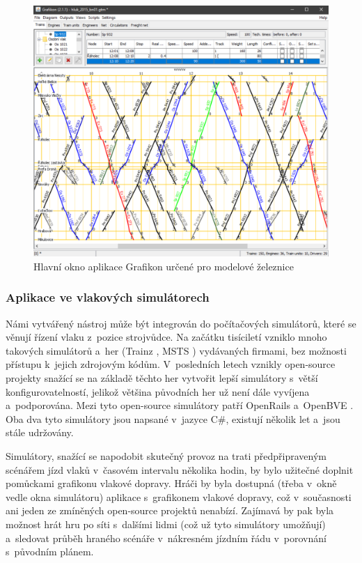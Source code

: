 \begin{figure}[ht]
	\centering
	\includegraphics[width=\textwidth]{../img/kap1_grafikon_modely}
	\caption{Hlavní okno aplikace Grafikon určené pro modelové železnice}
	\label{fig:grafikon_modely}
\end{figure}

\subsubsection{Aplikace ve vlakových simulátorech}
\label{uvod:prace_s_grafikony_vlakove_dopravy:simulatory}
Námi vytvářený nástroj může být integrován do počítačových simulátorů, které se věnují řízení vlaku z~pozice strojvůdce. Na začátku tisíciletí vzniklo mnoho takových simulátorů a~her (Trainz \cite{Trainz}, MSTS \cite{MSTS}) vydávaných firmami, bez možnosti přístupu k~jejich zdrojovým kódům. V~posledních letech vznikly open-source projekty snažící se na základě těchto her vytvořit lepší simulátory s~větší konfigurovatelností, jelikož většina původních her už není dále vyvíjena a~podporována. Mezi tyto open-source simulátory patří OpenRails \cite{OpenRails} a~OpenBVE \cite{OpenBVE}. Oba dva tyto simulátory jsou napsané v~jazyce C\#, existují několik let a~jsou stále udržovány.

Simulátory, snažící se napodobit skutečný provoz na trati předpřipraveným scénářem jízd vlaků v~časovém intervalu několika hodin, by bylo užitečné doplnit pomůckami grafikonu vlakové dopravy. Hráči by byla dostupná (třeba v~okně vedle okna simulátoru) aplikace s~grafikonem vlakové dopravy, což v~současnosti ani jeden ze zmíněných open-source projektů nenabízí. Zajímavá by pak byla možnost hrát hru po síti s~dalšími lidmi (což už tyto simulátory umožňují) a~sledovat průběh hraného scénáře v~nákresném jízdním řádu v~porovnání s~původním plánem.

